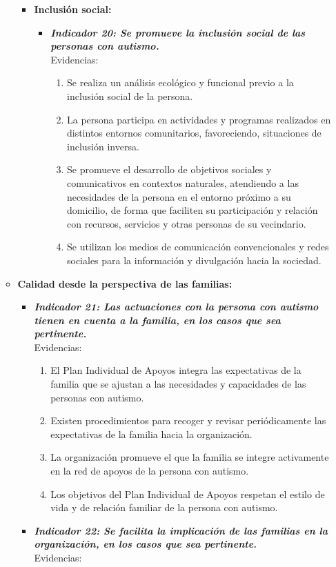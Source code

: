 \begin{itemize}
\begin{itemize}
\begin{itemize}
\begin{itemize}
\begin{enumerate}
				\end{enumerate}
			\end{itemize}
			\item \textbf{Inclusión social:}
			\begin{itemize}
				\item \textbf{\textit{Indicador 20: Se promueve la inclusión social de las personas con autismo.}}\\Evidencias:
				
				\begin{enumerate}
					\item Se realiza un análisis ecológico y funcional previo a la inclusión social de la persona. 
					\item La persona participa en actividades y programas realizados en distintos entornos comunitarios, favoreciendo, situaciones de inclusión inversa. 
					\item Se promueve el desarrollo de objetivos sociales y comunicativos en contextos naturales, atendiendo a las necesidades de la persona en el entorno próximo a su domicilio, de forma que faciliten su participación y relación con recursos, servicios y otras personas de su vecindario.       
					\item Se utilizan los medios de comunicación convencionales y redes sociales para la información y divulgación hacia la sociedad. 
					
				\end{enumerate}
				
			\end{itemize}
		\end{itemize}
		\item \textbf{Calidad desde la perspectiva de las familias:}
		\begin{itemize}
			\item \textbf{\textit{Indicador 21: Las actuaciones con la persona con autismo tienen en cuenta a la familia, en los casos que sea pertinente.}}\\Evidencias:
			
			\begin{enumerate}
				\item El Plan Individual de Apoyos integra las expectativas de la familia que se ajustan a las necesidades y capacidades de las personas con autismo. 
				\item Existen procedimientos para recoger y revisar periódicamente las expectativas de la familia hacia la organización.  
				\item La organización promueve el que la familia se integre activamente en la red de apoyos de la persona con autismo. 
				\item Los objetivos del Plan Individual de Apoyos respetan el estilo de vida y de relación familiar de la persona con autismo. 
			\end{enumerate}
			\item \textbf{\textit{Indicador 22: Se facilita la implicación de las familias en la organización, en los casos que sea pertinente.}}\\Evidencias:
			

\end{itemize}
\end{itemize}
\end{itemize}
